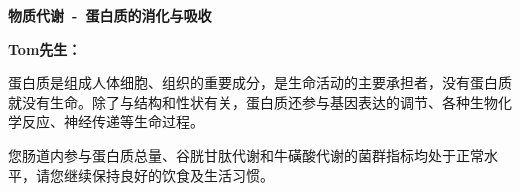 

\usepackage{graphicx}
\graphicspath{{cores/}}



\setlength{\arrayrulewidth}{0.5pt}
\fontsize{9.3pt}{17pt}\selectfont
\color{gray2}

\vspace*{0mm}
\begin{center}
{\bf\sanhao 物质代谢~-~蛋白质的消化与吸收}
\end{center}


\medskip
\noindent
{\bf\xiaosihao Tom先生：}

\bigskip

蛋白质是组成人体细胞、组织的重要成分，是生命活动的主要承担者，没有蛋白质就没有生命。除了与结构和性状有关，蛋白质还参与基因表达的调节、各种生物化学反应、神经传递等生命过程。

您肠道内参与蛋白质总量、谷胱甘肽代谢和牛磺酸代谢的菌群指标均处于正常水平，请您继续保持良好的饮食及生活习惯。

